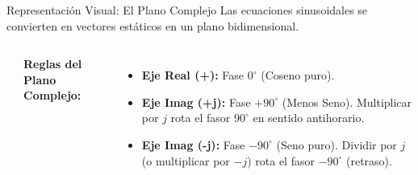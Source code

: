 \documentclass[aspectratio=169, 10pt]{beamer}
\begin{document}
\begin{frame}{Representación Visual: El Plano Complejo}
    Las ecuaciones sinusoidales se convierten en vectores estáticos en un plano bidimensional.
    \begin{columns}
        \begin{center}
        \end{center}
        
        \textbf{Reglas del Plano Complejo:}
        \begin{itemize}
            \item \textbf{Eje Real (+):} Fase $0^\circ$ (Coseno puro).
            \item \textbf{Eje Imag (+j):} Fase $+90^\circ$ (Menos Seno). Multiplicar por $j$ rota el fasor $90^\circ$ en sentido antihorario.
            \item \textbf{Eje Imag (-j):} Fase $-90^\circ$ (Seno puro). Dividir por $j$ (o multiplicar por $-j$) rota el fasor $-90^\circ$ (retraso).
        \end{itemize}
    \end{columns}
\end{frame}
\end{document}
